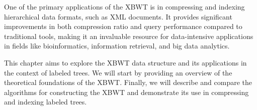 One of the primary applications of the XBWT is in compressing and indexing hierarchical data formats, such as XML documents. It provides significant improvements in both compression ratio and query performance compared to traditional tools, making it an invaluable resource for data-intensive applications in fields like bioinformatics, information retrieval, and big data analytics.

This chapter aims to explore the XBWT data structure and its applications in the context of labeled trees. We will start by providing an overview of the theoretical foundations of the XBWT. Finally, we will describe and compare the algorithms for constructing the XBWT and demonstrate its use in compressing and indexing labeled trees.

\begin{comment}
\subsection{How it Works}
The transformation process of the XBWT is as follows:
\begin{enumerate}
    \item \textbf{Path Sorting:} The labeled tree is linearized by sorting its nodes based on the \emph{paths} from each node's parent to the root. The resulting order groups nodes with similar upward paths together, clustering related labels.
    \item \textbf{Array Construction:} Two arrays, \( S_{\text{last}} \) and \( S_{\alpha} \), are generated:
    \begin{itemize}
        \item \( S_{\text{last}} \) stores structural information, such as whether a node is the last child of its parent. This encodes the tree structure without the need for explicit pointers.
        \item \( S_{\alpha} \) stores the labels of the nodes in the sorted order determined by their upward-path sorting.
    \end{itemize}
    \item \textbf{Compression:} Both \( S_{\text{last}} \) and \( S_{\alpha} \) are highly compressible due to the clustering of similar labels and structural redundancy.
\end{enumerate}
\end{comment}

